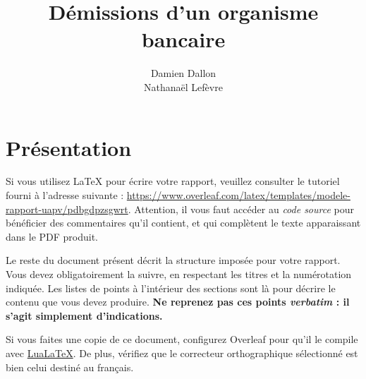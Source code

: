 \documentclass{ceri/sty/rapport}
\title{Démissions d’un organisme bancaire}
\author{
	Damien Dallon \\ %
	Nathanaël Lefèvre
}
\begin{document}
 

\maketitle

\sloppy      













\section{Présentation}



%



%

Si vous utilisez \LaTeX{} pour écrire votre rapport, veuillez consulter le tutoriel fourni à l'adresse suivante : \url{https://www.overleaf.com/latex/templates/modele-rapport-uapv/pdbgdpzsgwrt}. Attention, il vous faut accéder au \textit{code source} pour bénéficier des commentaires qu'il contient, et qui complètent le texte apparaissant dans le PDF produit.

Le reste du document présent décrit la structure imposée pour votre rapport. Vous devez obligatoirement la suivre, en respectant les titres et la numérotation indiquée. Les listes de points à l'intérieur des sections sont là pour décrire le contenu que vous devez produire. \textbf{Ne reprenez pas ces points \textit{verbatim} : il s'agit simplement d'indications.}

\begin{beware}[Remarque]
Si vous faites une copie de ce document, configurez Overleaf pour qu'il le compile avec \href{https://fr.wikipedia.org/wiki/LuaTeX}{LuaLaTeX}. De plus, vérifiez que le correcteur orthographique sélectionné est bien celui destiné au français.
\end{beware}
\end{document}
